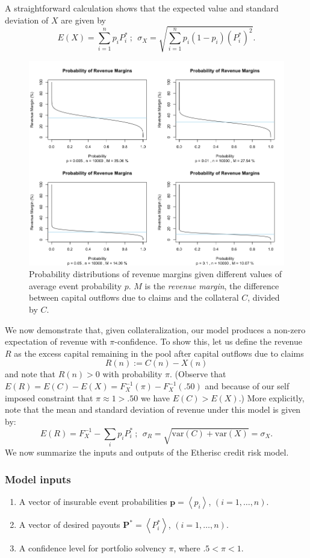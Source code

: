 \documentclass[12pt]{article}
\begin{document}
A straightforward calculation shows that the expected value and standard deviation of $X$ are given by
  $$E(X) = \sum_{i=1}^np_iP_i^*\ ;\ \ \sigma_X = \sqrt{\sum_{i=1}^np_i(1-p_i)(P_i^*)^2}.$$
\begin{figure}[H]
    \begin{center}
        \includegraphics[scale=.5]{margins}
    \end{center}
    \caption{\footnotesize Probability distributions of revenue margins given different values of average event probability $p$. $M$ is the \textit{revenue margin}, the difference between capital outflows due to claims and the collateral $C$, divided by $C$.}\label{fig1}
\end{figure}
We now demonstrate that, given collateralization, our model produces a non-zero expectation of revenue with $\pi$-confidence. To show this, let us define the revenue $R$ as the excess capital remaining in the pool after capital outflows due to claims
    $$R(n) := C(n) - X(n)$$ 
and note that $R(n)>0$ with probability $\pi$. (Observe that $E(R)=E(C)-E(X)=F_X^{-1}(\pi)-F_X^{-1}(.50)$ and because of our self imposed constraint that $\pi \approx 1 >.50$ we have $E(C)>E(X)$.) More explicitly, note that the mean and standard deviation of revenue under this model is given by:
$$E(R) = F_X^{-1} - \sum_i p_i P_i^*\ ;\ \ \sigma_R = \sqrt{\text{var}(C) + \text{var}(X)} = \sigma_X.$$
We now summarize the inputs and outputs of the Etherisc credit risk model.

\subsubsection{Model inputs}
\begin{enumerate}
    \item A vector of insurable event probabilities $\mathbf{p}=\left<p_i\right>$, $(i=1,\ldots,n)$.
    \item A vector of desired payouts $\mathbf{P^*} = \left<P_i^*\right>$, $(i=1,\ldots,n)$.
    \item A confidence level for portfolio solvency $\pi$, where $.5 < \pi < 1$.
\end{enumerate}
\end{document}
